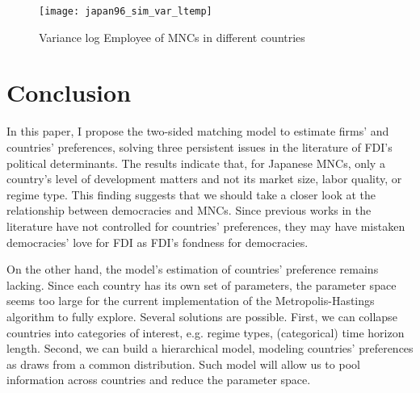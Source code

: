 \begin{figure}[!ht]
  \centering
  \texttt{[image: japan96\_sim\_var\_ltemp]}
  \caption{Variance log Employee of MNCs in different countries}
  \label{fig:japan96_sim_var_ltemp}
\end{figure}

\section{Conclusion}
\label{sec:conclusion}

In this paper, I propose the two-sided matching model to estimate firms' and countries' preferences, solving three persistent issues in the literature of FDI's political determinants. The results indicate that, for Japanese MNCs, only a country's level of development matters and not its market size, labor quality, or regime type. This finding suggests that we should take a closer look at the relationship between democracies and MNCs. Since previous works in the literature have not controlled for countries' preferences, they may have mistaken democracies' love for FDI as FDI's fondness for democracies.

On the other hand, the model's estimation of countries' preference remains
lacking. Since each country has its own set of parameters, the parameter space
seems too large for the current implementation of the Metropolis-Hastings
algorithm to fully explore. Several solutions are possible. First, we can
collapse countries into categories of interest, e.g. regime types, (categorical)
time horizon length. Second, we can build a hierarchical model, modeling
countries' preferences as draws from a common distribution. Such model will
allow us to pool information across countries and reduce the parameter space.

